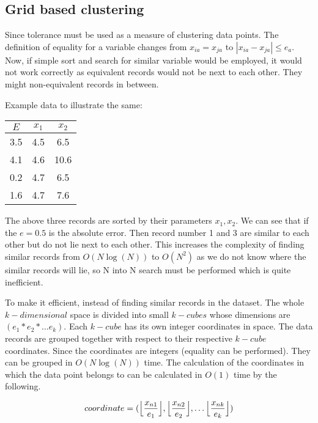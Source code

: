 \subsection{Grid based clustering}

Since tolerance must be used as a measure of clustering data points. The definition of equality for a variable changes from \(x_{ia} = x_{ja}\) to \(|x_{ia} - x_{ja}| \leq e_a\). Now, if simple sort and search for similar variable would be employed, it would not work correctly as equivalent records would not be next to each other. They might non-equivalent records in between.

Example data to illustrate the same:
\begin{center}
    \begin{tabular}{ | c | c | c |}
        \hline
        \(E\) & \(x_1\) & \(x_2\) \\ \hline
        3.5   & 4.5     & 6.5     \\\hline
        4.1   & 4.6     & 10.6    \\\hline
        0.2   & 4.7     & 6.5     \\\hline
        1.6   & 4.7     & 7.6     \\\hline
        \hline
    \end{tabular}
\end{center}

The above three records are sorted by their parameters \(x_1, x_2\). We can see that if the \(e = 0.5\) is the absolute error. Then record number 1 and 3 are similar to each other but do not lie next to each other. This increases the complexity of finding similar records from \(O(N \log(N))\) to \(O(N^2)\) as we do not know where the similar records will lie, so N into N search must be performed which is quite inefficient.

To make it efficient, instead of finding similar records in the dataset. The whole \(k-dimensional\) space is divided into small \(k-cubes\) whose dimensions are \((e_1 * e_2 * \ldots e_k)\). Each \(k-cube\) has its own integer coordinates in space. The data records are grouped together with respect to their respective \(k-cube\) coordinates. Since the coordinates are integers (equality can be performed). They can be grouped in \(O(N\log(N))\) time. The calculation of the coordinates in which the data point belongs to can be calculated in \(O(1)\) time by the following.

\[coordinate = (\Bigl\lfloor \frac{x_{n1}}{e_1} \Bigl\rfloor, \Bigl\lfloor \frac{x_{n2}}{e_2} \Bigl\rfloor, \ldots \Bigl\lfloor \frac{x_{nk}}{e_k} \Bigl\rfloor)\]

